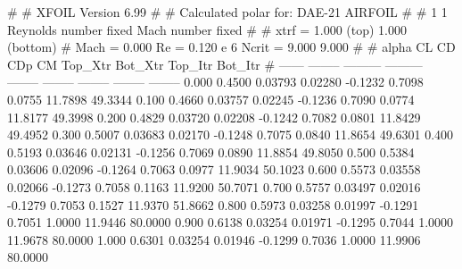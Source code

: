 #  
#       XFOIL         Version 6.99
#  
# Calculated polar for: DAE-21 AIRFOIL                                  
#  
# 1 1 Reynolds number fixed          Mach number fixed         
#  
# xtrf =   1.000 (top)        1.000 (bottom)  
# Mach =   0.000     Re =     0.120 e 6     Ncrit =   9.000  9.000
#  
#   alpha    CL        CD       CDp       CM     Top_Xtr  Bot_Xtr  Top_Itr  Bot_Itr
#  ------ -------- --------- --------- -------- -------- -------- -------- --------
   0.000   0.4500   0.03793   0.02280  -0.1232   0.7098   0.0755  11.7898  49.3344
   0.100   0.4660   0.03757   0.02245  -0.1236   0.7090   0.0774  11.8177  49.3998
   0.200   0.4829   0.03720   0.02208  -0.1242   0.7082   0.0801  11.8429  49.4952
   0.300   0.5007   0.03683   0.02170  -0.1248   0.7075   0.0840  11.8654  49.6301
   0.400   0.5193   0.03646   0.02131  -0.1256   0.7069   0.0890  11.8854  49.8050
   0.500   0.5384   0.03606   0.02096  -0.1264   0.7063   0.0977  11.9034  50.1023
   0.600   0.5573   0.03558   0.02066  -0.1273   0.7058   0.1163  11.9200  50.7071
   0.700   0.5757   0.03497   0.02016  -0.1279   0.7053   0.1527  11.9370  51.8662
   0.800   0.5973   0.03258   0.01997  -0.1291   0.7051   1.0000  11.9446  80.0000
   0.900   0.6138   0.03254   0.01971  -0.1295   0.7044   1.0000  11.9678  80.0000
   1.000   0.6301   0.03254   0.01946  -0.1299   0.7036   1.0000  11.9906  80.0000
